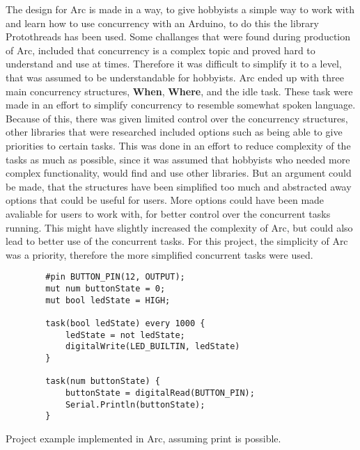 The design for Arc is made in a way, to give hobbyists a simple way to work with and learn how to use concurrency with an Arduino, to do this the library Protothreads has been used. Some challanges that were found during production of Arc, included that concurrency is a complex topic and proved hard to understand and use at times. Therefore it was difficult to simplify it to a level, that was assumed to be understandable for hobbyists. Arc ended up with three main concurrency structures, \textbf{When}, \textbf{Where}, and the idle task. These task were made in an effort to simplify concurrency to resemble somewhat spoken language. Because of this, there was given limited control over the concurrency structures, other libraries that were researched included options such as being able to give priorities to certain tasks. This was done in an effort to reduce complexity of the tasks as much as possible, since it was assumed that hobbyists who needed more complex functionality, would find and use other libraries. But an argument could be made, that the structures have been simplified too much and abstracted away options that could be useful for users. More options could have been made avaliable for users to work with, for better control over the concurrent tasks running. This might have slightly increased the complexity of Arc, but could also lead to better use of the concurrent tasks. For this project, the simplicity of Arc was a priority, therefore the more simplified concurrent tasks were used. 



\begin{listing}[htb!]
    \begin{verbatim}
        #pin BUTTON_PIN(12, OUTPUT);
        mut num buttonState = 0;
        mut bool ledState = HIGH;

        task(bool ledState) every 1000 {
            ledState = not ledState;
            digitalWrite(LED_BUILTIN, ledState)
        }

        task(num buttonState) {
            buttonState = digitalRead(BUTTON_PIN);
            Serial.Println(buttonState);
        }
    \end{verbatim}
    \caption{Project example implemented in Arc, assuming print is possible.}
    \label{lst:arcexample}
\end{listing}